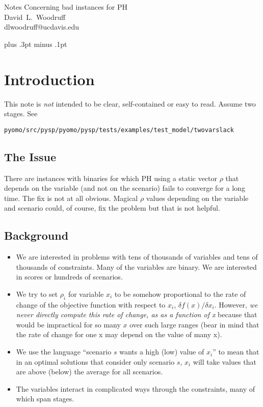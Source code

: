\documentclass[12pt]{article}
\begin{document}
\begin{center}
  {\LARGE Notes Concerning bad instances for PH}\\[12pt]
  {\large
        \mbox{David L. Woodruff}
  }\\[12pt]
   \mbox{dlwoodruff@ucdavis.edu}
\end{center}

\baselineskip 20pt plus .3pt minus .1pt

\noindent\hrulefill

\noindent 

\noindent\hrulefill


\section{Introduction \label{sec:introduction}}

This note is {\em not} intended to be clear, self-contained or easy to
read. Assume two stages. See

\verb|pyomo/src/pysp/pyomo/pysp/tests/examples/test_model/twovarslack|

\subsection{The Issue}

There are instances with binaries for which PH using a static vector
$\rho$ that depends on the variable (and not on the scenario) fails to
converge for a long time. The fix is not at all obvious. Magical
$\rho$ values depending on the variable and scenario could, of course, fix the problem but that is not
helpful.

\subsection{Background}

\begin{itemize}
\item We are interested in problems with tens of thousands of variables and tens of thousands of constraints. Many of the variables are binary. We are interested in scores or hundreds of scenarios.
\item We try to set $\rho_{i}$ for variable $x_{i}$ to be somehow proportional to the rate of change of the objective function with respect to $x_{i}$, $\delta f(x)/\delta x_{i}$. However, {\em we never directly compute this rate of change, as as a function of x} because that would be impractical for so many $x$ over such large ranges (bear in mind that the rate of change for one x may depend on the value of many x).
\item We use the language ``scenario $s$ wants a high (low) value of $x_{i}$'' to mean that in an optimal solutions that consider only scenario $s$, $x_{i}$ will take values that are above (below) the average for all scenarios.
\item The variables interact in complicated ways through the constraints, many of which span stages.
\end{itemize}
\end{document}
